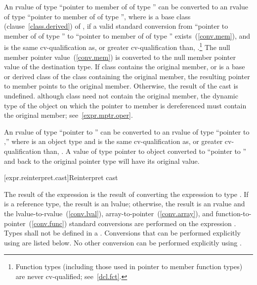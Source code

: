 \pnum
{}%
An rvalue of type ``pointer to member of  of type 
'' can be converted to an rvalue of type ``pointer to member of
 of type  '', where  is a base
class (clause~\ref{class.derived}) of , if a valid standard
conversion from ``pointer to member of  of type '' to
``pointer to member of  of type ''
exists~(\ref{conv.mem}), and  is the same cv-qualification
as, or greater cv-qualification than, .\footnote{Function types
(including those used in pointer to member function
types) are never cv-qualified; see~\ref{dcl.fct}.}
The null member pointer value~(\ref{conv.mem}) is converted to the null
member pointer value of the destination type. If class 
contains the original member, or is a base or derived class of the class
containing the original member, the resulting pointer to member points
to the original member. Otherwise, the result of the cast is undefined.
\enternote 
although class  need not contain the original member, the
dynamic type of the object on which the pointer to member is
dereferenced must contain the original member; see~\ref{expr.mptr.oper}.
\exitnote 

\pnum
An rvalue of type ``pointer to  '' can be
converted to an rvalue of type ``pointer to  ,''
where  is an object type and  is the same
cv-qualification as, or greater cv-qualification than, .
A value of type pointer to object converted to
``pointer to  '' and back to the original pointer
type will have its original value.

[expr.reinterpret.cast]{Reinterpret cast}

\pnum
{}%
%
The result of the expression  is the
result of converting the expression  to type .
%
%
If  is a reference type, the result is an lvalue;
otherwise, the result is an rvalue and the
lvalue-to-rvalue~(\ref{conv.lval}), array-to-pointer~(\ref{conv.array}),
and function-to-pointer~(\ref{conv.func}) standard conversions are
performed on the expression . Types shall not be defined in
a . Conversions that can be performed explicitly
using  are listed below. No other conversion can
be performed explicitly using .


